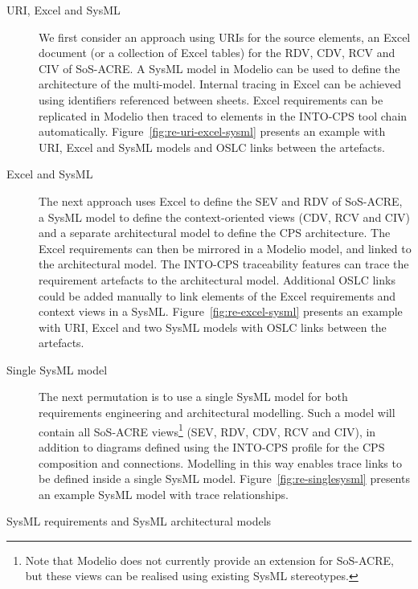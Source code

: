 \begin{description}

\item[URI, Excel and SysML]

We first consider an approach using URIs for the source elements, an Excel document (or a collection of Excel tables) for the RDV, CDV, RCV and CIV of SoS-ACRE. A SysML model in Modelio can be used to define the architecture of the multi-model. Internal tracing in Excel can be achieved using identifiers referenced between sheets. Excel requirements can be replicated in Modelio then traced to elements in the INTO-CPS tool chain automatically. Figure~\ref{fig:re-uri-excel-sysml} presents an example with URI, Excel and SysML models and OSLC links between the artefacts.

\item[Excel and SysML]

The next approach uses Excel to define the SEV and RDV of SoS-ACRE, a SysML model to define the context-oriented views (CDV, RCV and CIV) and a separate architectural model to define the CPS architecture. The Excel requirements can then be mirrored in a Modelio model, and linked to the architectural model. The INTO-CPS traceability features can trace the requirement artefacts to the architectural model. Additional OSLC links could be added manually to link elements of the Excel requirements and context views in a SysML.  Figure~\ref{fig:re-excel-sysml} presents an example with URI, Excel and two SysML models with OSLC links between the artefacts.

\item[Single SysML model]

The next permutation is to use a single SysML model for both requirements engineering and architectural modelling. Such a model will contain all SoS-ACRE views\footnote{Note that Modelio does not currently provide an extension for SoS-ACRE, but these views can be realised using existing SysML stereotypes.} (SEV, RDV, CDV, RCV and CIV), in addition to diagrams defined using the INTO-CPS profile for the CPS composition and connections. Modelling in this way enables trace links to be defined inside a single SysML model. Figure~\ref{fig:re-singlesysml} presents an example SysML model with trace relationships.



\item[SysML requirements and SysML architectural models]


\end{description}
